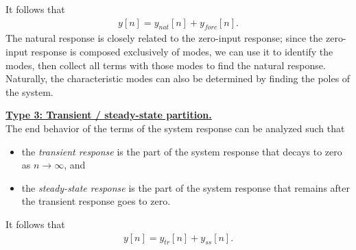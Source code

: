 \documentclass{report}
\begin{document}
\noindent It follows that 
\begin{align}
    y[n] = y_{nat}[n] + y_{forc}[n].
\end{align}
The natural response is closely related to the zero-input response; since the zero-input response is composed exclusively of modes, we can use it to identify the modes, 
then collect all terms with those modes to find the natural response. Naturally, the characteristic modes can also be determined by finding the poles of the system.
\begin{tcolorbox}[width=\textwidth,colback={white}, sharp corners]
    \textbf{\underline{Type 3: Transient / steady-state partition.}} \\[0.25cm]
    The end behavior of the terms of the system response can be analyzed such that
    \begin{itemize}
        \item the \emph{transient response} is the part of the system response that decays to zero as $n\to\infty$, and
        \item the \emph{steady-state response} is the part of the system response that remains after the transient response goes to zero.
    \end{itemize}
\end{tcolorbox}
\noindent It follows that 
\begin{align}
    y[n] = y_{tr}[n] + y_{ss}[n].
\end{align}
\end{document}
